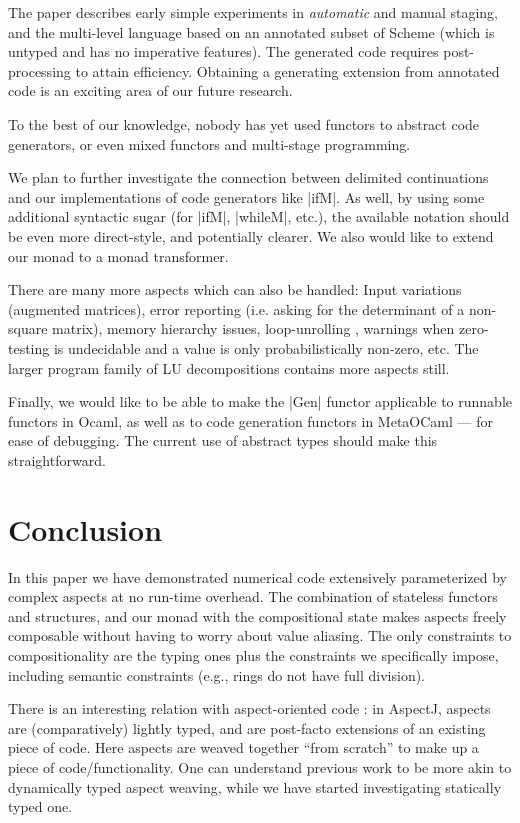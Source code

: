 \documentclass{llncs}
\begin{document}
The paper \cite{GluckJ98} describes early simple experiments in
\emph{automatic} and manual staging, and the multi-level language
based on an annotated subset of Scheme (which is untyped and has no
imperative features). The generated code requires post-processing to
attain efficiency. Obtaining a generating extension from annotated
code is an exciting area of our future research.

To the best of our knowledge, nobody has yet used functors to
abstract code generators, or even mixed functors and 
multi-stage programming.

We plan to further investigate the connection between delimited
continuations and our implementations of code generators like
|ifM|.  As well, by using some additional syntactic sugar
(for |ifM|, |whileM|, etc.), the available notation should be
even more direct-style, and potentially clearer.
We also would like to extend our monad to a monad transformer.


There are many more aspects which can also be handled:
Input variations (augmented
matrices), error reporting (i.e. asking for the determinant of a 
non-square matrix), memory hierarchy issues, loop-unrolling
\cite{Padua:MetaOcaml:04},
warnings when zero-testing is undecidable and
a value is only probabilistically non-zero, etc.  The larger program
family of LU decompositions contains more aspects still.

Finally, we would like to be able to make the |Gen| functor applicable
to runnable functors in Ocaml, as well as to code generation functors
in MetaOCaml --- for ease of debugging.  The current use of abstract
types should make this straightforward.

\section{Conclusion}\label{conclusion}
In this paper we have demonstrated numerical code extensively parameterized
by complex aspects at no run-time overhead.  The combination of
stateless functors and structures, and our monad with the
compositional state makes aspects freely composable without having to
worry about value aliasing. The only constraints to compositionality
are the typing ones plus the constraints we specifically
impose, including semantic constraints (e.g., rings do not have full
division).

There is an interesting relation with aspect-oriented code
\cite{kiczales97aspectoriented}: in AspectJ, 
aspects are (comparatively) lightly typed, and are post-facto extensions of an
existing piece of code.  Here aspects are weaved together ``from scratch'' to
make up a piece of code/functionality.  One can understand previous work to be
more akin to dynamically typed aspect weaving, while we have started
investigating statically typed one.
\end{document}
